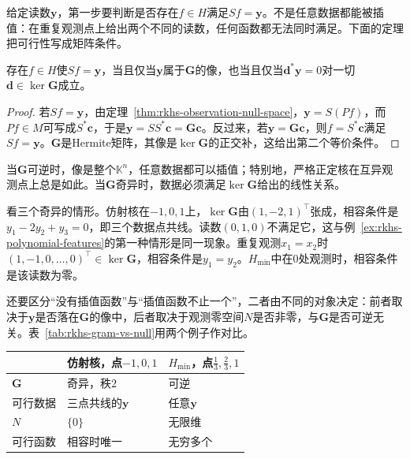 给定读数$\bm y$，第一步要判断是否存在$f\in H$满足$Sf=\bm y$。不是任意数据都能被插值：在重复观测点上给出两个不同的读数，任何函数都无法同时满足。下面的定理把可行性写成矩阵条件。

\begin{theorem}[插值约束的相容性]
\label{thm:rkhs-consistency}
存在$f\in H$使$Sf=\bm y$，当且仅当$\bm y$属于$\bm G$的像，也当且仅当$\bm d^*\bm y=0$对一切$\bm d\in\ker\bm G$成立。
\end{theorem}

\begin{proof}
若$Sf=\bm y$，由定理~\ref{thm:rkhs-observation-null-space}，$\bm y=S(Pf)$，而$Pf\in M$可写成$S^*\bm c$，于是$\bm y=SS^*\bm c=\bm G\bm c$。反过来，若$\bm y=\bm G\bm c$，则$f=S^*\bm c$满足$Sf=\bm y$。$\bm G$是Hermite矩阵，其像是$\ker\bm G$的正交补，这给出第二个等价条件。
\end{proof}

当$\bm G$可逆时，像是整个$\mathbb K^n$，任意数据都可以插值；特别地，严格正定核在互异观测点上总是如此。当$\bm G$奇异时，数据必须满足$\ker\bm G$给出的线性关系。

看三个奇异的情形。仿射核在$-1,0,1$上，$\ker\bm G$由$(1,-2,1)^{\top}$张成，相容条件是$y_1-2y_2+y_3=0$，即三个数据点共线。读数$(0,1,0)$不满足它，这与例~\ref{ex:rkhs-polynomial-features}的第一种情形是同一现象。重复观测$x_1=x_2$时$(1,-1,0,\ldots,0)^{\top}\in\ker\bm G$，相容条件是$y_1=y_2$。$H_{\min}$中在$0$处观测时，相容条件是该读数为零。

还要区分“没有插值函数”与“插值函数不止一个”，二者由不同的对象决定：前者取决于$\bm y$是否落在$\bm G$的像中，后者取决于观测零空间$N$是否非零，与$\bm G$是否可逆无关。表~\ref{tab:rkhs-gram-vs-null}用两个例子作对比。

\begin{BookInlineTable}
  \centering
  \begin{tabular}{@{}lll@{}}
    \toprule
    & 仿射核，点$-1,0,1$ & $H_{\min}$，点$\tfrac13,\tfrac23,1$\\
    \midrule
    $\bm G$ & 奇异，秩$2$ & 可逆\\
    可行数据 & 三点共线的$\bm y$ & 任意$\bm y$\\
    $N$ & $\{0\}$ & 无限维\\
    可行函数 & 相容时唯一 & 无穷多个\\
    \bottomrule
  \end{tabular}
  \caption{Gram矩阵是否可逆与插值是否唯一是两回事。}
  \label{tab:rkhs-gram-vs-null}
\end{BookInlineTable}

